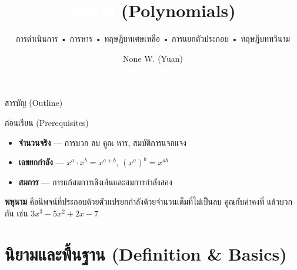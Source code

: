 \documentclass[11pt, aspectratio=169]{beamer}
\title[พหุนาม]{\textcolor{white}{พหุนาม} \textcolor{boxBlue!60}{(Polynomials)}}
\subtitle{การดำเนินการ • การหาร • ทฤษฎีบทเศษเหลือ • การแยกตัวประกอบ • ทฤษฎีบททวินาม }
\author[None W. (Yuan)]{None W. (Yuan)}
\date{}
\begin{document}
\begin{frame}[plain]\titlepage\end{frame}
\begin{frame}{สารบัญ (Outline)}\tableofcontents\end{frame}

\begin{frame}{ก่อนเรียน (Prerequisites)}
  \begin{explanation}
    \begin{itemize}
      \item \textbf{จำนวนจริง} — การบวก ลบ คูณ หาร, สมบัติการแจกแจง
      \item \textbf{เลขยกกำลัง} — $x^a \cdot x^b = x^{a+b}$, $(x^a)^b = x^{ab}$
      \item \textbf{สมการ} — การแก้สมการเชิงเส้นและสมการกำลังสอง
    \end{itemize}
  \end{explanation}

  \begin{intuition}
    \textbf{พหุนาม} คือนิพจน์ที่ประกอบด้วยตัวแปรยกกำลังด้วยจำนวนเต็มที่ไม่เป็นลบ
    คูณกับค่าคงที่ แล้วบวกกัน เช่น $3x^3 - 5x^2 + 2x - 7$
  \end{intuition}
\end{frame}

\section{นิยามและพื้นฐาน (Definition \& Basics)}
\end{document}
